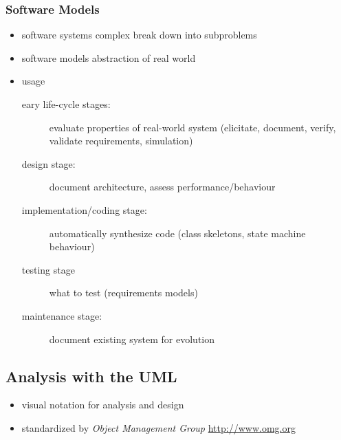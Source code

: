 \documentclass[a4paper, 10pt]{article}
\begin{document}
\subsubsection{Software Models}
\begin{itemize}
	\item software systems complex \follows break down into subproblems
	\item software models \follows abstraction of real world
	\item usage
		\begin{description}
			\item[eary life-cycle stages:] evaluate properties of real-world system (elicitate, document, verify, validate requirements, simulation)
			\item[design stage:] document architecture, assess performance/behaviour
			\item[implementation/coding stage:] automatically synthesize code (class skeletons, state machine behaviour)
			\item[testing stage] what to test (requirements models)
			\item[maintenance stage:] document existing system for evolution
		\end{description}
\end{itemize}

\subsection{Analysis with the UML}
\begin{itemize}
	\item visual notation for analysis and design
	\item standardized by \emph{Object Management Group} \url{http://www.omg.org}
\end{itemize}
\end{document}
